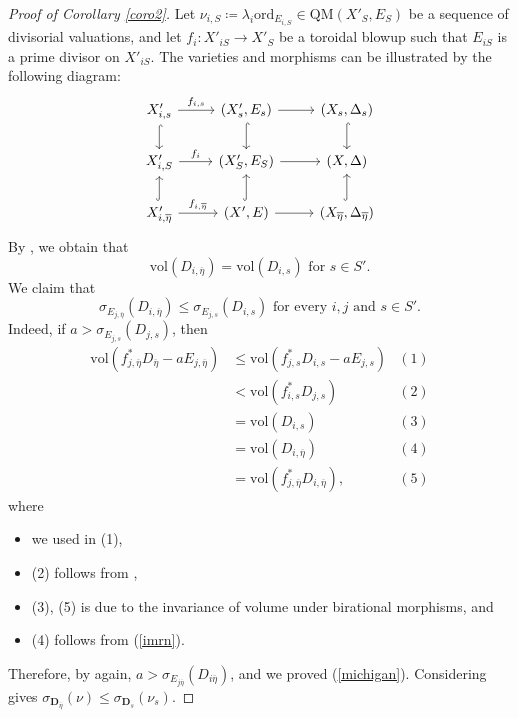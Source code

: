 \documentclass[a4paper,12pt]{amsart}
\theoremstyle{plain}
\theoremstyle{definition}
\numberwithin{equation}{section}
\begin{document}
\begin{proof}[Proof of Corollary \ref{coro2}]
Let $\nu_{i,S}\coloneqq \lambda_i \mathrm{ord}_{E_{i,S}}\in \mathrm{QM}(X'_S,E_S)$ be a sequence of divisorial valuations, and let $f_i\colon X'_{iS}\to X'_S$ be a toroidal blowup such that $E_{iS}$ is a prime divisor on $X'_{iS}$. The varieties and morphisms can be illustrated by the following diagram:
$$
\begin{tikzcd}
X'_{i,s}\ar[hook]{d}\ar["f_{i,s}"]{r}& (X'_{s},E_s) \ar[hook]{d}\ar{r}& (X_{s},\Delta_s)\ar[hook]{d} \\
X'_{i,S} \ar["f_i"]{r}& (X'_S,E_S) \ar{r}& (X,\Delta) \\
X'_{i,\overline{\eta}} \ar[hook]{u}\ar["f_{i,\overline{\eta}}"]{r}& (X',E) \ar[hook]{u}\ar{r}& (X_{\overline{\eta}},\Delta_{\overline{\eta}})\ar[hook]{u}
\end{tikzcd}
$$
By \cite[Theorem 1.1]{Jun26}, we obtain that
\begin{equation} \label{imrn} 
\mathrm{vol}(D_{i,\overline{\eta}})=\mathrm{vol}(D_{i,s})\text{ for }s\in S'.
\end{equation}
We claim that
\begin{equation} \label{michigan} 
\sigma_{E_{j,\overline{\eta}}}(D_{i,\overline{\eta}})\le \sigma_{E_{j,s}}(D_{i,s}) \text{ for every }i,j\text{ and }s\in S'.
\end{equation}
Indeed, if $a>\sigma_{E_{j,s}}(D_{j,s})$, then
$$
\begin{aligned}
\mathrm{vol}(f^*_{j,\overline{\eta}}D_{\overline{\eta}}-aE_{j,\overline{\eta}})&\le \mathrm{vol}(f^*_{j,s}D_{i,s}-aE_{j,s}) & (1)
\\ & <\mathrm{vol}(f^*_{i,s}D_{j,s})& (2)
\\ &=\mathrm{vol}(D_{i,s})& (3)
\\ &=\mathrm{vol}(D_{i,\overline{\eta}})& (4)
\\ &=\mathrm{vol}(f^*_{j,\overline{\eta}}D_{i,\overline{\eta}}),& (5)
\end{aligned}
$$
where
\begin{itemize}
    \item we used \cite[Theorem 12.8]{Har77} in (1),
    \item (2) follows from \cite[Proposition 2.1]{FKL16},
    \item (3), (5) is due to the invariance of volume under birational morphisms, and
    \item (4) follows from (\ref{imrn}).
\end{itemize}
Therefore, by \cite[Proposition 2.1]{FKL16} again, $a>\sigma_{E_{j\overline{\eta}}}(D_{i\overline{\eta}})$, and we proved (\ref{michigan}). Considering \cite[Corollary 2.13]{Kim25} gives $\sigma_{\mathbf{D}_{\overline{\eta}}}(\nu)\le \sigma_{\mathbf{D}_s}(\nu_s)$.


\end{proof}
\end{document}
